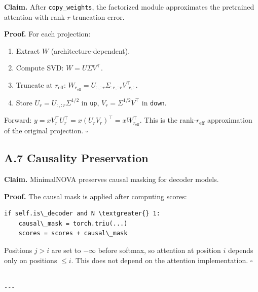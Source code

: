 \textbf{Claim.} After \texttt{copy\_weights}, the factorized module approximates the 
pretrained attention with rank-$r$ truncation error.

\textbf{Proof.} For each projection:
\begin{enumerate}
\item Extract $W$ (architecture-dependent).
\item Compute SVD: $W = U \Sigma V^\top$.
\item Truncate at $r_\text{eff}$: $W_{r_\text{eff}} = U_{:, :r} \Sigma_{:r, :r} V_{:r, :}^\top$.
\item Store $U_r = U_{:, :r} \Sigma^{1/2}$ in \texttt{up}, $V_r = \Sigma^{1/2} V^\top$ in \texttt{down}.

\end{enumerate}
Forward: $y = x V_r^\top U_r^\top = x (U_r V_r)^\top = x W_{r_\text{eff}}^\top$. 
This is the rank-$r_\text{eff}$ approximation of the original projection. $\square$

\subsection{A.7 Causality Preservation}

\textbf{Claim.} MinimalNOVA preserves causal masking for decoder models.

\textbf{Proof.} The causal mask is applied after computing scores:

\begin{lstlisting}
if self.is\_decoder and N \textgreater{} 1:
    causal\_mask = torch.triu(...)
    scores = scores + causal\_mask
\end{lstlisting}

Positions $j > i$ are set to $-\infty$ before softmax, so attention at 
position $i$ depends only on positions $\leq i$. This does not depend on the 
attention implementation. $\square$
\begin{lstlisting}

---
\end{lstlisting}